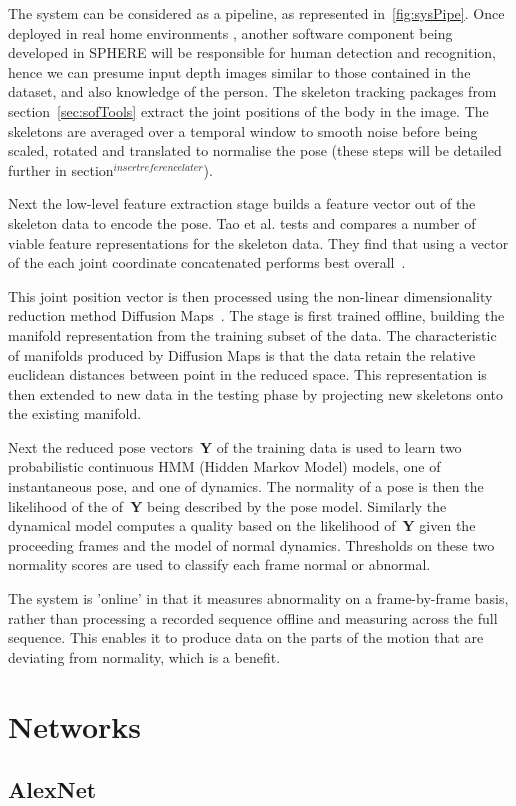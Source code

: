 \documentclass[11pt]{article} %
\begin{document}
\begin{appendices}
The system can be considered as a pipeline, as represented in~\ref{fig:sysPipe}. Once deployed in real home environments , another software component being developed in SPHERE will be responsible for human detection and recognition, hence we can presume input depth images similar to those contained in the dataset, and also knowledge of the person. The skeleton tracking packages from section~\ref{sec:sofTools} extract the joint positions of the body in the image. The skeletons are averaged over a temporal window to smooth noise before being scaled, rotated and translated to normalise the pose (these steps will be detailed further in section$^{insert reference later}$).  

Next the low-level feature extraction stage builds a feature vector out of the skeleton data to encode the pose. Tao et al. tests and compares a number of viable feature representations for the skeleton data. They find that using a vector of the each joint coordinate concatenated performs best overall~\cite{Tao}. 

This joint position vector is then processed using the non-linear dimensionality reduction method Diffusion Maps~\cite{Coifman2006}. The stage is first trained offline, building the manifold representation from the training subset of the data. The characteristic of manifolds produced by Diffusion Maps is that the data retain the relative euclidean distances between point in the reduced space. This representation is then extended to new data in the testing phase by projecting new skeletons onto the existing manifold. 

Next the reduced pose vectors~\textbf{Y} of the training data is used to learn two probabilistic continuous HMM (Hidden Markov Model) models, one of instantaneous pose, and one of dynamics. The normality of a pose is then the likelihood of the of~\textbf{Y} being described by the pose model. Similarly the dynamical model computes a quality based on the likelihood of~\textbf{Y} given the proceeding frames and the model of normal dynamics. Thresholds on these two normality scores are used to classify each frame normal or abnormal.

The system is 'online' in that it measures abnormality on a frame-by-frame basis, rather than processing a recorded sequence offline and measuring across the full sequence. This enables it to produce data on the parts of the motion that are deviating from normality, which is a benefit.
 

\section{Networks}
\label{sec:networkCodes}

\subsection{AlexNet}

\end{appendices}
\end{document}
